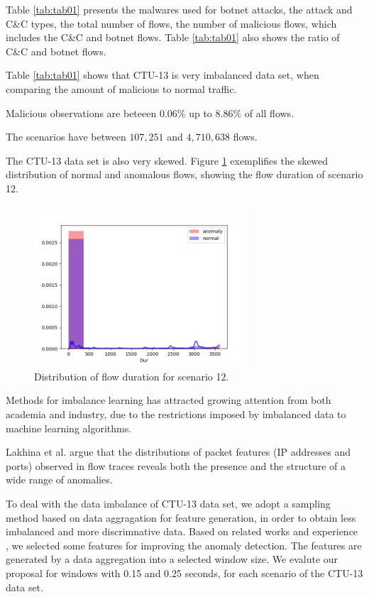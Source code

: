 \documentclass[review]{elsarticle}
\begin{document}
Table \ref{tab:tab01} presents the malwares used for botnet attacks, the attack and C\&C types, the total number of flows, the number of malicious flows, which includes the C\&C and botnet flows. Table \ref{tab:tab01} also shows the ratio of C\&C and botnet flows.

Table \ref{tab:tab01} shows that CTU-13 is very imbalanced data set, when comparing the amount of malicious to normal traffic.

Malicious observations are beteeen $0.06\%$ up to $8.86\%$ of all flows.

The scenarios have between $107,251$ and $4,710,638$ flows.

The CTU-13 data set is also very skewed. Figure \ref{fig:fig06} exemplifies the skewed distribution of normal and anomalous flows, showing the flow duration of scenario 12.

\begin{figure}[h!]
     \centering
     \includegraphics[width=8cm]{figures/raw_distplot_capture20110812_Dur.png}
     \caption{Distribution of flow duration for scenario 12.}
     \label{fig:fig06}
\end{figure}
	
Methods for imbalance learning has attracted growing attention from both academia and industry, due to the restrictions imposed by imbalanced data to machine learning algorithms.

Lakhina et al. \cite{lakhina2005mining} argue that the distributions of packet features (IP addresses and ports) observed in flow traces reveals both the presence and the structure of a wide range of anomalies.

To deal with the data imbalance of CTU-13 data set, we adopt a sampling method based on data aggragation for feature generation, in order to obtain less imbalanced and more discrimnative data. Based on related works \cite{lakhina2005mining,gu2008botminer,callegari2011novel,chandrashekar2014survey,garcia2014empirical,acarali2016survey} and experience \cite{vieira2017model, galibus2017offline}, we selected some features for improving the anomaly detection.
The features are generated by a data aggregation into a selected window size. We evalute our proposal for windows with 0.15 and 0.25 seconds, for each scenario of the CTU-13 data set.
	
\end{document}
